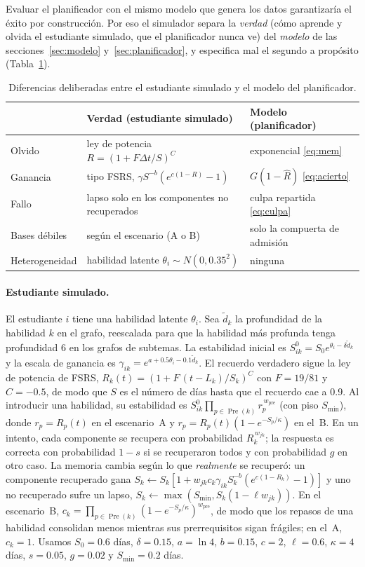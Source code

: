 \documentclass[runningheads]{llncs}
\newcommand{\Pre}{\operatorname{Pre}}
\newcommand{\Rh}{\hat R}
\newcommand{\Smin}{S_{\min}}
\begin{document}
Evaluar el planificador con el mismo modelo que genera los datos garantizaría el éxito por construcción. Por eso el simulador separa la \emph{verdad} (cómo aprende y olvida el estudiante simulado, que el planificador nunca ve) del \emph{modelo} de las secciones~\ref{sec:modelo} y~\ref{sec:planificador}, y especifica mal el segundo a propósito (Tabla~\ref{tab:verdad}).

\begin{table}[t]
\centering
\caption{Diferencias deliberadas entre el estudiante simulado y el modelo del planificador.}
\label{tab:verdad}
\setlength{\tabcolsep}{4pt}
\begin{tabularx}{\textwidth}{@{}l>{\raggedright\arraybackslash}X>{\raggedright\arraybackslash}X@{}}
\toprule
& Verdad (estudiante simulado) & Modelo (planificador) \\
\midrule
Olvido & ley de potencia $R=(1+F\Delta t/S)^{C}$ & exponencial \eqref{eq:mem} \\
Ganancia & tipo FSRS, $\gamma S^{-b}(e^{c(1-R)}-1)$ & $G(1-\Rh)$ \eqref{eq:acierto} \\
Fallo & lapso solo en los componentes no recuperados & culpa repartida \eqref{eq:culpa} \\
Bases débiles & según el escenario (A o B) & solo la compuerta de admisión \\
Heterogeneidad & habilidad latente $\theta_i\sim N(0,0.35^2)$ & ninguna \\
\bottomrule
\end{tabularx}
\end{table}

\paragraph{Estudiante simulado.} El estudiante $i$ tiene una habilidad latente $\theta_i$. Sea $\tilde d_k$ la profundidad de la habilidad $k$ en el grafo, reescalada para que la habilidad más profunda tenga profundidad 6 en los grafos de subtemas. La estabilidad inicial es $S^0_{ik}=S_0e^{\theta_i-\delta\tilde d_k}$ y la escala de ganancia es $\gamma_{ik}=e^{a+0.5\theta_i-0.1\tilde d_k}$. El recuerdo verdadero sigue la ley de potencia de FSRS, $R_k(t)=(1+F\,(t-L_k)/S_k)^{C}$ con $F=19/81$ y $C=-0.5$, de modo que $S$ es el número de días hasta que el recuerdo cae a 0.9. Al introducir una habilidad, su estabilidad es $S^0_{ik}\prod_{p\in\Pre(k)}r_p^{\,w_{\mathrm{pre}}}$ (con piso $\Smin$), donde $r_p=R_p(t)$ en el escenario~A y $r_p=R_p(t)(1-e^{-S_p/\kappa})$ en el~B. En un intento, cada componente se recupera con probabilidad $R_k^{\,w_{jk}}$; la respuesta es correcta con probabilidad $1-s$ si se recuperaron todos y con probabilidad $g$ en otro caso. La memoria cambia según lo que \emph{realmente} se recuperó: un componente recuperado gana $S_k\leftarrow S_k[1+w_{jk}c_k\gamma_{ik}S_k^{-b}(e^{c(1-R_k)}-1)]$ y uno no recuperado sufre un lapso, $S_k\leftarrow\max(\Smin,S_k(1-\ell w_{jk}))$. En el escenario~B, $c_k=\prod_{p\in\Pre(k)}(1-e^{-S_p/\kappa})^{w_{\mathrm{pre}}}$, de modo que los repasos de una habilidad consolidan menos mientras sus prerrequisitos sigan frágiles; en el~A, $c_k=1$. Usamos $S_0=0.6$ días, $\delta=0.15$, $a=\ln4$, $b=0.15$, $c=2$, $\ell=0.6$, $\kappa=4$ días, $s=0.05$, $g=0.02$ y $\Smin=0.2$ días.
\end{document}
